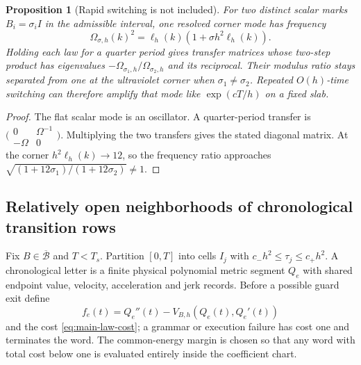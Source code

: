 \documentclass[11pt]{article}
\numberwithin{equation}{section}
\newtheorem{proposition}[proposition]{Proposition}
\theoremstyle{definition}
\theoremstyle{remark}
\begin{document}
\begin{proposition}[Rapid switching is not included]
\label{prop:supp-law-switching}
For two distinct scalar marks $B_i=\sigma_iI$ in the admissible interval, one
resolved corner mode has frequency
\begin{equation}
 \Omega_{\sigma,h}(k)^2=\ell_h(k)(1+\sigma h^2\ell_h(k)).
 \label{eq:supp-law-dispersion}
\end{equation}
Holding each law for a quarter period gives transfer matrices whose two-step
product has eigenvalues
$-\Omega_{\sigma_1,h}/\Omega_{\sigma_2,h}$ and its reciprocal.  Their modulus
ratio stays separated from one at the ultraviolet corner when
$\sigma_1\ne\sigma_2$.  Repeated $O(h)$-time switching can therefore amplify
that mode like $\exp(cT/h)$ on a fixed slab.
\end{proposition}
\begin{proof}
The flat scalar mode is an oscillator.  A quarter-period transfer is
$\bigl(\begin{smallmatrix}0&\Omega^{-1}\\-\Omega&0\end{smallmatrix}\bigr)$.
Multiplying the two transfers gives the stated diagonal matrix.  At the
corner $h^2\ell_h(k)\to12$, so the frequency ratio approaches
$\sqrt{(1+12\sigma_1)/(1+12\sigma_2)}\ne1$.
\end{proof}

\subsection{Relatively open neighborhoods of chronological transition rows}

Fix $B\in\overline{\mathcal B}$ and $T<T_s$.  Partition $[0,T]$ into cells
$I_j$ with $c_-h^2\le\tau_j\le c_+h^2$.  A chronological letter is a finite
physical polynomial metric segment $Q_e$ with shared endpoint value,
velocity, acceleration and jerk records.  Before a possible guard exit define
\begin{equation}
 f_e(t)=Q_e''(t)-V_{B,h}(Q_e(t),Q_e'(t))
 \label{eq:supp-law-residual}
\end{equation}
and the cost \eqref{eq:main-law-cost}; a grammar or execution failure has cost
one and terminates the word.  The common-energy margin is chosen so that any
word with total cost below one is evaluated entirely inside the coefficient
chart.
\end{document}
